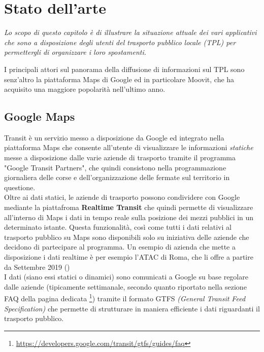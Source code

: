 \chapter{Stato dell'arte} %
%

\begin{citazione}
    \textit{Lo scopo di questo capitolo è di illustrare la situazione attuale dei vari applicativi che sono a disposizione degli utenti del trasporto pubblico locale (TPL) per permettergli di organizzare i loro spostamenti.}
\end{citazione}

\newpage

I principali attori sul panorama della diffusione di informazioni sul TPL sono senz'altro la piattaforma Maps di Google ed in particolare Moovit, che ha acquisito una maggiore popolarità nell'ultimo anno.

\section{Google Maps}
    Transit è un servizio messo a disposizione da Google ed integrato nella piattaforma Maps che consente all'utente di visualizzare le informazioni \textit{statiche} messe a disposizione dalle varie aziende di trasporto tramite il programma "Google Transit Partners", che quindi consistono nella programmazione giornaliera delle corse e dell'organizzazione delle fermate sul territorio in questione. \\
    Oltre ai dati statici, le aziende di trasporto possono condividere con Google mediante la piattafroma \textbf{Realtime Transit} che quindi permette di visualizzare all'interno di Maps i dati in tempo reale sulla posizione dei mezzi pubblici in un determinato istante. Questa funzionalità, così come tutti i dati relativi al trasporto pubblico su Maps sono disponibili solo su iniziativa delle aziende che decidono di partecipare al programma. Un esempio di azienda che mette a disposizione i dati realtime è per esempio l'ATAC di Roma, che li offre a partire da Settembre 2019 (\cite{atactransit})  \\
    I dati (siano essi statici o dinamici) sono comunicati a Google su base regolare dalle aziende (tipicamente settimanale, secondo quanto riportato nella sezione FAQ della pagina dedicata \footnote[3]{\url{https://developers.google.com/transit/gtfs/guides/faq}}) tramite il formato GTFS \textit{(General Transit Feed Specification)} che permette di strutturare in maniera efficiente i dati riguardanti il trasporto pubblico.

